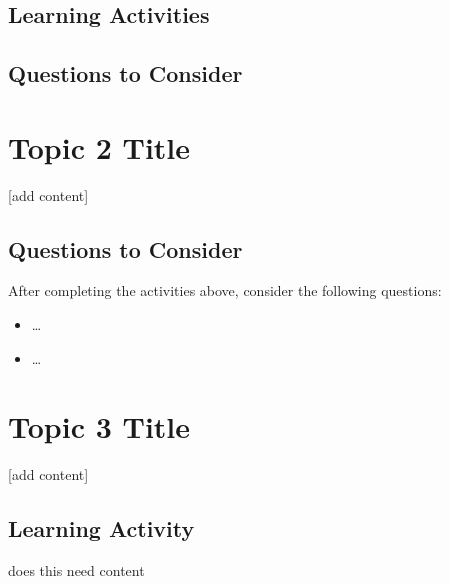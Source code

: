 \documentclass[
]{book}
\providecommand{\tightlist}{%
  \setlength{\itemsep}{0pt}\setlength{\parskip}{0pt}}
\begin{document}
\hypertarget{learning-activities-2}{%
\subsection*{Learning Activities}\label{learning-activities-2}}

\hypertarget{questions-to-consider-1}{%
\subsection*{Questions to Consider}\label{questions-to-consider-1}}

\hypertarget{topic-2-title}{%
\section{Topic 2 Title}\label{topic-2-title}}

{[}add content{]}

\hypertarget{questions-to-consider-2}{%
\subsection*{Questions to Consider}\label{questions-to-consider-2}}

After completing the activities above, consider the following questions:

\begin{itemize}
\tightlist
\item
  \ldots{}\\
\item
  \ldots{}
\end{itemize}

\hypertarget{topic-3-title}{%
\section{Topic 3 Title}\label{topic-3-title}}

{[}add content{]}

\hypertarget{learning-activity-5}{%
\subsection*{Learning Activity}\label{learning-activity-5}}

\begin{reflect}
does this need content
\end{reflect}
\end{document}

